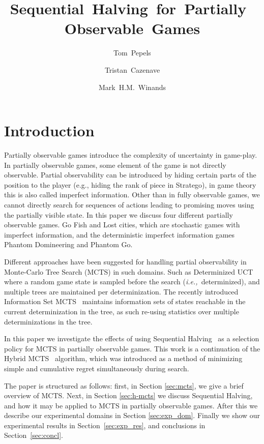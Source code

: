 \documentclass[a4paper]{llncs}
\title{Sequential~Halving~for~Partially~Observable~Games}
\author{Tom~Pepels\inst{1} \and Tristan~Cazenave\inst{2} \and Mark~H.M.~Winands\inst{1}}
\institute{Department of Knowledge Engineering,  Maastricht University\\ \email{\{tom.pepels,m.winands\}@maastrichtuniversity.nl} \and LAMSADE - Université Paris-Dauphine \\ \email{cazenave@lamsade.dauphine.fr}}
\newcommand{\ie}{{\it i.e.,}~}
\begin{document}
\maketitle

\begin{abstract} 

\end{abstract}

\section{Introduction}
\label{sec:intro}

Partially observable games introduce the complexity of uncertainty in game-play. In partially observable games, some element of the game is not directly observable. Partial observability can be introduced by hiding certain parts of the  position to the player (e.g., hiding the rank of piece in Stratego), in game theory this is also called imperfect information. Other than in fully observable games, we cannot directly search for sequences of actions leading to promising moves using the partially visible state. In this paper we discuss four different partially observable games. Go Fish and Lost cities, which are stochastic games with imperfect information, and the deterministic imperfect information games Phantom Domineering and Phantom Go.

Different approaches have been suggested for handling partial observability in Monte-Carlo Tree Search (MCTS) in such domains. Such as Determinized UCT~\cite{cowling2012} where a random game state is sampled before the search (\ie determinized), and multiple trees are maintained per determinization. The recently introduced Information Set MCTS~\cite{cowling2012} maintains information sets of states reachable in the current determinization in the tree, as such re-using statistics over multiple determinizations in the tree.

In this paper we investigate the effects of using Sequential Halving~\cite{Karnin13SH} as a selection policy for MCTS in partially observable games. This work is a continuation of the Hybrid MCTS~\cite{Pepels14hmcts} algorithm, which was introduced as a method of minimizing simple and cumulative regret simultaneously during search.

The paper is structured as follows: first, in Section \ref{sec:mcts}, we give a brief overview of MCTS. Next, in Section \ref{sec:h-mcts} we discuss Sequential Halving, and how it may be applied to MCTS in partially observable games. After this we describe our experimental domains in Section \ref{sec:exp_dom}. Finally we show our experimental results in Section~\ref{sec:exp_res}, and conclusions in Section~\ref{sec:concl}.
\end{document}
